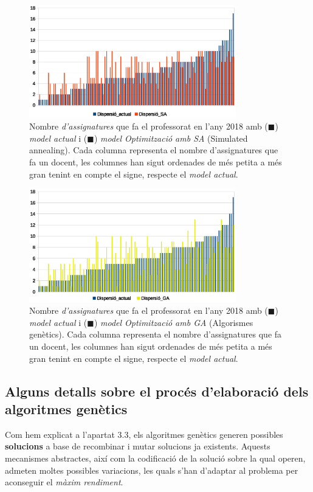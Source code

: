 \documentclass[10pt,twocolumn]{article}
\begin{document}
	\begin{figure}[!]
		\centering
		\includegraphics[width=9cm]{disp_sorted_sa}
		\caption{ \small Nombre \textit{d'assignatures} que fa el professorat en l'any 2018 amb  ({\color{blue!70}$\blacksquare$}) \textit{model actual} i ({\color{orange!70!red!90}$\blacksquare$}) \textit{model Optimització amb SA} (Simulated annealing). Cada columna representa el nombre d'assignatures que fa un docent, les columnes han sigut ordenades de més petita a més gran tenint en compte el signe, respecte el \textit{model actual}. }
		\label{fig:sor}
	\end{figure}
	\begin{figure}[!]
		\centering
		\includegraphics[width=9cm]{disp_sorted_ga}
		\caption{ \small  Nombre \textit{d'assignatures} que fa el professorat en l'any 2018 amb  ({\color{blue!70}$\blacksquare$}) \textit{model actual} i ({\color{yellow!70!gray!90}$\blacksquare$}) \textit{model Optimització amb GA} (Algorismes genètics). Cada columna representa el nombre d'assignatures que fa un docent, les columnes han sigut ordenades de més petita a més gran tenint en compte el signe, respecte el \textit{model actual}. }
		\label{fig:sorted_mo}
	\end{figure}
\newpage
\subsection{Alguns detalls sobre el procés d'elaboració dels algoritmes genètics}
\normalsize
Com hem explicat a l'apartat 3.3, els algoritmes genètics generen possibles \textbf{solucions} a base de recombinar i mutar solucions ja existents. Aquests mecanismes abstractes, així com la codificació de la solució sobre la qual operen, admeten moltes possibles variacions, les quals s'han d'adaptar al problema per aconseguir el \textit{màxim rendiment}.
\end{document}
